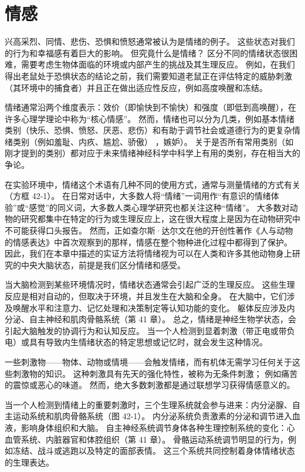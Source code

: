 \chapter{情感} \label{chap:chap42}

兴高采烈、同情、悲伤、恐惧和愤怒通常被认为是情绪的例子。 这些状态对我们的行为和幸福感有着巨大的影响。 但究竟什么是情绪？ 区分不同的情绪状态很困难，需要考虑生物体面临的环境或内部产生的挑战及其生理反应。 例如，在我们得出老鼠处于恐惧状态的结论之前，我们需要知道老鼠正在评估特定的威胁刺激（其环境中的捕食者）并且正在做出适应性反应，例如高度唤醒和冻结。

情绪通常沿两个维度表示：效价（即愉快到不愉快）和强度（即低到高唤醒），在许多心理学理论中称为“核心情感”。 然而，情绪也可以分为几类，例如基本情绪类别（快乐、恐惧、愤怒、厌恶、悲伤）和有助于调节社会或道德行为的更复杂情绪类别（例如羞耻、内疚、尴尬、骄傲） ，嫉妒）。 关于是否所有常用类别（如刚才提到的类别）都对应于未来情绪神经科学中科学上有用的类别，存在相当大的争论。

在实验环境中，情绪这个术语有几种不同的使用方式，通常与测量情绪的方式有关（方框 42-1）。 在日常对话中，大多数人将“情绪”一词用作“有意识的情绪体验”或“感觉”的同义词，大多数人类心理学研究也都关注这种“情绪”。 大多数对动物的研究都集中在特定的行为或生理反应上，这在很大程度上是因为在动物研究中不可能获得口头报告。 然而，正如查尔斯·达尔文在他的开创性著作《人与动物的情感表达》中首次观察到的那样，情感在整个物种进化过程中都得到了保护。 因此，我们在本章中描述的实证方法将情绪视为可以在人类和许多其他动物身上研究的中央大脑状态，前提是我们区分情绪和感受。

当大脑检测到某些环境情况时，情绪状态通常会引起广泛的生理反应。 这些生理反应是相对自动的，但取决于环境，并且发生在大脑和全身。 在大脑中，它们涉及唤醒水平和注意力、记忆处理和决策制定等认知功能的变化。 躯体反应涉及内分泌、自主神经和肌肉骨骼系统（第 41 章）。 总之，情绪是神经生物学状态，会引起大脑触发的协调行为和认知反应。 当一个人检测到显着刺激（带正电或带负电）或具有导致内生情绪状态的特定思想或记忆时，就会发生这种情况。

一些刺激物——物体、动物或情境——会触发情绪，而有机体无需学习任何关于这些刺激物的知识。 这种刺激具有先天的强化特性，被称为无条件刺激； 例如痛苦的震惊或恶心的味道。 然而，绝大多数刺激都是通过联想学习获得情感意义的。

当一个人检测到情绪上的重要刺激时，三个生理系统就会参与进来：内分泌腺、自主运动系统和肌肉骨骼系统（图 42-1）。 
内分泌系统负责激素的分泌和调节进入血液，影响身体组织和大脑。 自主神经系统调节身体各种生理控制系统的变化：心血管系统、内脏器官和体腔组织（第 41 章）。 骨骼运动系统调节明显的行为，例如冻结、战斗或逃跑以及特定的面部表情。 这三个系统共同控制着身体情绪状态的生理表达。

